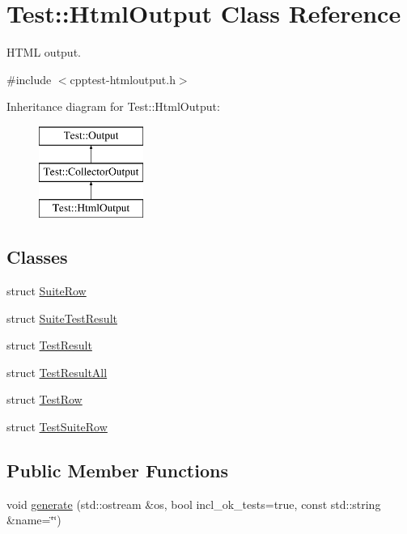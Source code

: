 \hypertarget{class_test_1_1_html_output}{}\section{Test\+:\+:Html\+Output Class Reference}
\label{class_test_1_1_html_output}


H\+T\+ML output.  




{\ttfamily \#include $<$cpptest-\/htmloutput.\+h$>$}

Inheritance diagram for Test\+:\+:Html\+Output\+:\begin{figure}[H]
\begin{center}
\leavevmode
\includegraphics[height=3.000000cm]{class_test_1_1_html_output}
\end{center}
\end{figure}
\subsection*{Classes}
\begin{DoxyCompactItemize}
\item 
struct \hyperlink{struct_test_1_1_html_output_1_1_suite_row}{Suite\+Row}
\item 
struct \hyperlink{struct_test_1_1_html_output_1_1_suite_test_result}{Suite\+Test\+Result}
\item 
struct \hyperlink{struct_test_1_1_html_output_1_1_test_result}{Test\+Result}
\item 
struct \hyperlink{struct_test_1_1_html_output_1_1_test_result_all}{Test\+Result\+All}
\item 
struct \hyperlink{struct_test_1_1_html_output_1_1_test_row}{Test\+Row}
\item 
struct \hyperlink{struct_test_1_1_html_output_1_1_test_suite_row}{Test\+Suite\+Row}
\end{DoxyCompactItemize}
\subsection*{Public Member Functions}
\begin{DoxyCompactItemize}
\item 
void \hyperlink{class_test_1_1_html_output_a589e4e59aee4da0f70f3f6568daaf0f0}{generate} (std\+::ostream \&os, bool incl\+\_\+ok\+\_\+tests=true, const std\+::string \&name=\char`\"{}\char`\"{})
\end{DoxyCompactItemize}

